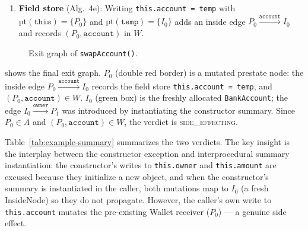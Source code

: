 \begin{enumerate}
  \noindent
  After instantiation: $I = \{I_0 \xrightarrow{\texttt{owner}} P_1\}$, $W = \varnothing$. Variable \texttt{temp} $\to \{I_0\}$.

\item \textbf{Field store} (Alg.~4e): Writing \texttt{this.account = temp} with $\text{pt}(\texttt{this}) = \{P_0\}$ and $\text{pt}(\texttt{temp}) = \{I_0\}$ adds an inside edge $P_0 \xrightarrow{\texttt{account}} I_0$ and records $(P_0, \texttt{account})$ in $W$.
\end{enumerate}

\begin{figure}[h]
\centering
{}
\caption{Exit graph of \texttt{swapAccount()}.}
\label{fig:swap-exit}
\end{figure}

\noindent
{} shows the final exit graph.
$P_0$ (double red border) is a mutated prestate node: the inside edge $P_0 \xrightarrow{\texttt{account}} I_0$ records the field store \texttt{this.account = temp}, and $(P_0, \texttt{account}) \in W$. $I_0$ (green box) is the freshly allocated \texttt{BankAccount}; the edge $I_0 \xrightarrow{\texttt{owner}} P_1$ was introduced by instantiating the constructor summary. Since $P_0 \in A$ and $(P_0, \texttt{account}) \in W$, the verdict is \textsc{side\_effecting}.

\medskip
\noindent
Table~\ref{tab:example-summary} summarizes the two verdicts. The key insight is the interplay between the constructor exception and interprocedural summary instantiation: the constructor's writes to \texttt{this.owner} and \texttt{this.amount} are excused because they initialize a new object, and when the constructor's summary is instantiated in the caller, both mutations map to $I_0$ (a fresh InsideNode) so they do not propagate. However, the caller's own write to \texttt{this.account} mutates the pre-existing Wallet receiver ($P_0$) --- a genuine side effect.

